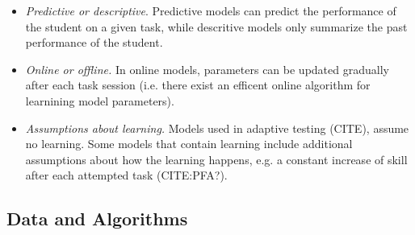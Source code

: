 \begin{itemize}
\item \emph{Predictive or descriptive}.
Predictive models can predict the performance of the student on a given task,
while descritive models only summarize the past performance of the student.
\item \emph{Online or offline.}
In online models, parameters can be updated gradually after each task session
(i.e. there exist an efficent online algorithm for learnining model parameters).
\item \emph{Assumptions about learning.}
Models used in adaptive testing (CITE), assume no learning.
Some models that contain learning include additional assumptions
about how the learning happens, e.g. a constant increase of skill
after each attempted task (CITE:PFA?).
\end{itemize}



\subsection{Data and Algorithms}

